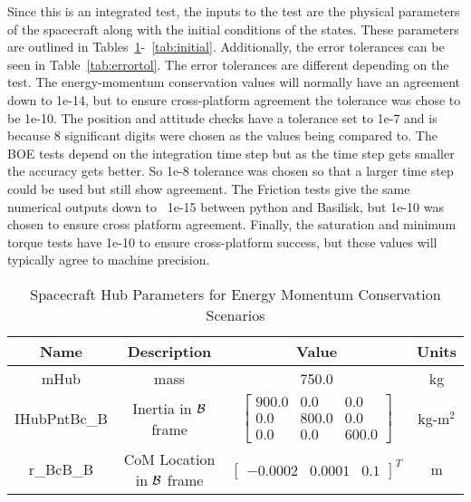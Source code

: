 Since this is an integrated test, the inputs to the test are the physical parameters of the spacecraft along with the initial conditions of the states. These parameters are outlined in Tables~\ref{tab:hub}-~\ref{tab:initial}. Additionally, the error tolerances can be seen in Table~\ref{tab:errortol}. The error tolerances are different depending on the test. The energy-momentum conservation values will normally have an agreement down to 1e-14, but to ensure cross-platform agreement the tolerance was chose to be 1e-10. The position and attitude checks have a tolerance set to 1e-7 and is because 8 significant digits were chosen as the values being compared to. The BOE tests depend on the integration time step but as the time step gets smaller the accuracy gets better. So 1e-8 tolerance was chosen so that a larger time step could be used but still show agreement. The Friction tests give the same numerical outputs down to ~1e-15 between python and Basilisk, but 1e-10 was chosen to ensure cross platform agreement. Finally, the saturation and minimum torque tests have 1e-10 to ensure cross-platform success, but these values will typically agree to machine precision. 

\begin{table}[htbp]
	\caption{Spacecraft Hub Parameters for Energy Momentum Conservation Scenarios}
	\label{tab:hub}
	\centering \fontsize{10}{10}\selectfont
	\begin{tabular}{ c | c | c | c } %
		\hline
		\textbf{Name}  & \textbf{Description}  & \textbf{Value} & \textbf{Units} \\
		\hline
		mHub  & mass & 750.0 & kg \\
		IHubPntBc\_B & Inertia in $\cal{B}$ frame & $\begin{bmatrix}
		900.0 & 0.0 & 0.0\\
		0.0 & 800.0 & 0.0\\
		0.0 & 0.0 & 600.0
		\end{bmatrix}$ & kg-m$^2$ \\
		r\_BcB\_B & CoM Location in $\cal{B}$ frame & $\begin{bmatrix}
		-0.0002 & 0.0001 & 0.1 \end{bmatrix}^T$ & m \\
		\hline
	\end{tabular}
\end{table}

